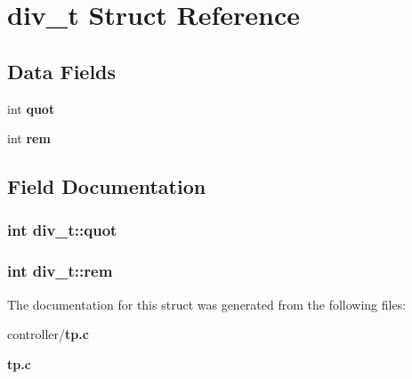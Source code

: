 \section{div\_\-t Struct Reference}
\label{structdiv__t}
\subsection*{Data Fields}
\begin{DoxyCompactItemize}
\item 
int {\bf quot}
\item 
int {\bf rem}
\end{DoxyCompactItemize}


\subsection{Field Documentation}
\subsubsection[{quot}]{\setlength{\rightskip}{0pt plus 5cm}int {\bf div\_\-t::quot}}\label{structdiv__t_a0b9dda2884048daa68ca4aaa12b17b9a}
\subsubsection[{rem}]{\setlength{\rightskip}{0pt plus 5cm}int {\bf div\_\-t::rem}}\label{structdiv__t_ac64389de252de53eda8b4f8dbb7c623f}


The documentation for this struct was generated from the following files:\begin{DoxyCompactItemize}
\item 
controller/{\bf tp.c}\item 
{\bf tp.c}\end{DoxyCompactItemize}
